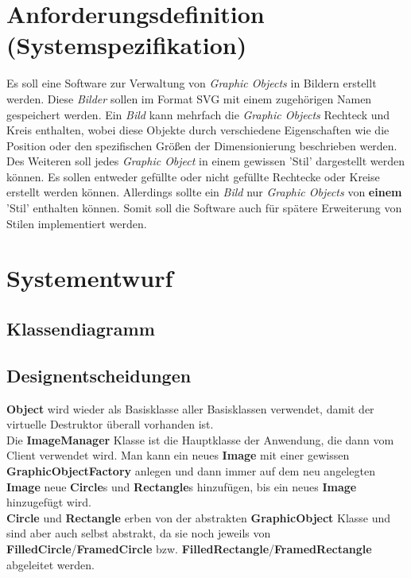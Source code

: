 \section{Anforderungsdefinition (Systemspezifikation)}

Es soll eine Software zur Verwaltung von \textit{Graphic Objects} in Bildern erstellt werden. Diese \textit{Bilder} sollen im Format SVG mit einem zugehörigen Namen gespeichert werden.
Ein \textit{Bild} kann mehrfach die \textit{Graphic Objects} Rechteck und Kreis enthalten, wobei diese Objekte durch verschiedene Eigenschaften wie die Position oder den spezifischen Größen der Dimensionierung beschrieben werden.
Des Weiteren soll jedes \textit{Graphic Object} in einem gewissen 'Stil' dargestellt werden können. Es sollen entweder gefüllte oder nicht gefüllte Rechtecke oder Kreise erstellt werden können.
Allerdings sollte ein \textit{Bild} nur \textit{Graphic Objects} von \textbf{einem} 'Stil' enthalten können. Somit soll die Software auch für spätere Erweiterung von Stilen implementiert werden.


\section{Systementwurf}

\subsection{Klassendiagramm}

\subsection{Designentscheidungen}

\textbf{Object} wird wieder als Basisklasse aller Basisklassen verwendet, damit der virtuelle Destruktor überall vorhanden ist.\\

Die \textbf{ImageManager} Klasse ist die Hauptklasse der Anwendung, die dann vom Client verwendet wird. Man kann ein neues \textbf{Image} mit einer gewissen \textbf{GraphicObjectFactory} anlegen und dann immer auf dem neu angelegten \textbf{Image} neue \textbf{Circle}s und \textbf{Rectangle}s hinzufügen, bis ein neues \textbf{Image} hinzugefügt wird.\\

\textbf{Circle} und \textbf{Rectangle} erben von der abstrakten \textbf{GraphicObject} Klasse und sind aber auch selbst abstrakt, da sie noch jeweils von \textbf{FilledCircle}/\textbf{FramedCircle} bzw. \textbf{FilledRectangle}/\textbf{FramedRectangle} abgeleitet werden.\\

